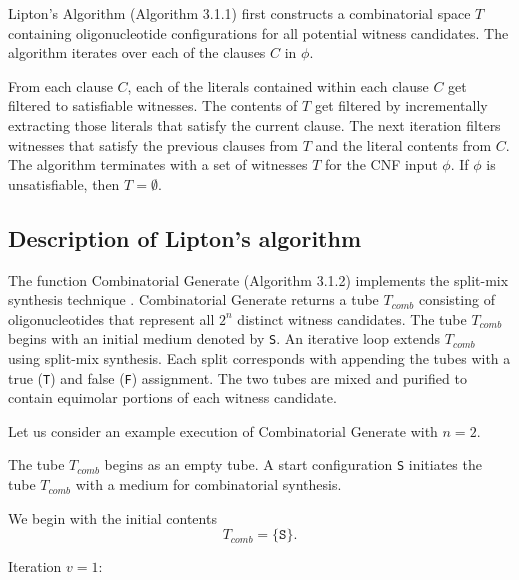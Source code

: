 {\sc Lipton's Algorithm} (Algorithm 3.1.1) first constructs a combinatorial space $T$ containing oligonucleotide configurations for all potential witness candidates.  The algorithm iterates over each of the clauses $C$ in $\phi$.  

From each clause $C$, each of the literals contained within each clause $C$ get filtered to satisfiable witnesses.  The contents of $T$ get filtered by incrementally extracting those literals that satisfy the current clause.  The next iteration filters witnesses that satisfy the previous clauses from $T$ and the literal contents from $C$.  The algorithm terminates with a set of witnesses $T$ for the CNF input $\phi$.  If $\phi$ is unsatisfiable, then $T = \emptyset$.  


	
\FloatBarrier

	\subsection{Description of Lipton's algorithm}
		
The function {\sc Combinatorial Generate} (Algorithm 3.1.2) implements the split-mix synthesis technique \cite{furka1982, furkaBook}.  {\sc Combinatorial Generate} returns a tube $T_{comb}$ consisting of oligonucleotides that represent all $2^n$ distinct witness candidates.  The tube $T_{comb}$ begins with an initial medium denoted by \texttt{S}.  An iterative loop extends $T_{comb}$ using split-mix synthesis.  Each split corresponds with appending the tubes with a true (\texttt{T}) and false (\texttt{F}) assignment.  The two tubes are mixed and purified to contain equimolar portions of each witness candidate.  


\FloatBarrier

Let us consider an example execution of {\sc Combinatorial Generate} with $n = 2$.

\noindent The tube $T_{comb}$ begins as an empty tube.  A start configuration \texttt{S} initiates the tube $T_{comb}$ with a medium for combinatorial synthesis.

\noindent We begin with the initial contents
\[
T_{comb} = \{ \texttt{S} \}.
\]

\noindent Iteration $v = 1$:

